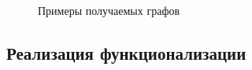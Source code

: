   \begin{figure}[h]
	\begin{minipage}[h]{0.49\linewidth}
	\end{minipage}
	\hfill
	\begin{minipage}[h]{0.49\linewidth}
	\end{minipage}
	\caption{Примеры получаемых графов}
  \end{figure}

\subsection{Реализация функционализации}

